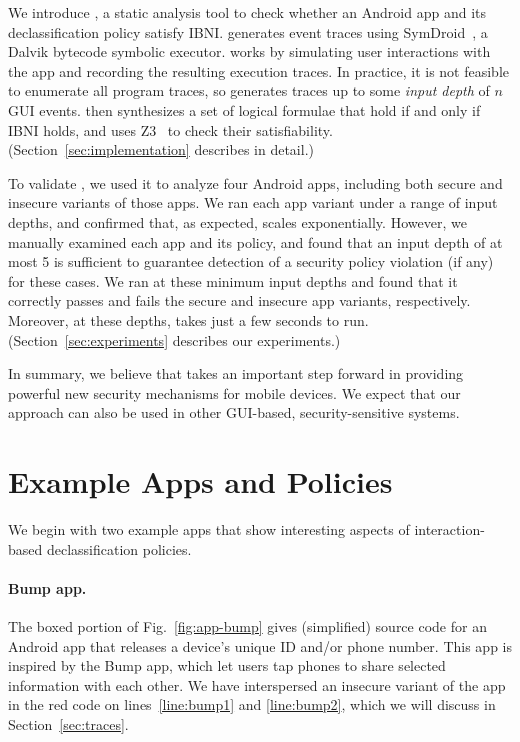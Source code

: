 We introduce \toolname, a static analysis tool to check
whether an Android app and its declassification policy
satisfy IBNI.
\toolname generates event traces using SymDroid~\cite{Jeon:2012}, a
Dalvik bytecode symbolic executor.  \toolname
works by simulating user interactions with the app and recording the
resulting execution traces.
In practice, it is not feasible to
enumerate all program traces, so \toolname generates traces up to some
\emph{input depth} of $n$ GUI events.  
\toolname{} then synthesizes a
set of logical formulae that hold if and only if IBNI holds, and uses
Z3~\cite{deMoura:2008} to check their satisfiability.
(Section~\ref{sec:implementation} describes \toolname in detail.)

To validate \toolname, we used it to analyze four Android apps,
including both secure and insecure variants of those apps.
We ran each app variant under a range of input depths, and confirmed
that, as expected, \toolname{} scales exponentially.
However, we manually examined each app and its policy, and
found that an input depth of at most 5 is sufficient to
guarantee detection of a security policy violation (if any) for these
cases.  We ran \toolname{} at these minimum input depths and found
that it correctly passes and fails the secure and insecure app
variants, respectively. Moreover, at these depths, \toolname{} takes just a few
seconds to run. (Section~\ref{sec:experiments} describes our experiments.)

In summary, we believe that \toolname takes an important step forward
in providing powerful new security mechanisms for mobile devices. We
expect that our approach can also be used in other
GUI-based, security-sensitive systems.

\section{Example Apps and Policies}
\label{sec:overview}

We begin with two example apps that show interesting aspects of
interaction-based declassification
policies.

\paragraph*{Bump app.}

The boxed portion of Fig.~\ref{fig:app-bump} gives (simplified) source
code for an Android app that releases a device's unique ID and/or phone
number. This app is inspired by the Bump app, which let users tap
phones to share selected information with each other.  We have
interspersed an insecure variant of the app in the red code on
lines~\ref{line:bump1} and \ref{line:bump2}, which we will
discuss in Section~\ref{sec:traces}.

